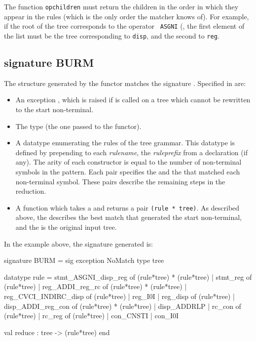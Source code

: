 The function {\tt opchildren} must return the children in the order in
which they appear in the rules (which is the only order the matcher knows
of).  For example, if the root of the tree corresponds to the operator {\tt
ASGNI} (, the first element of the list
must be the tree corresponding to {\tt disp}, and the second 
to {\tt reg}.



	\subsection{signature BURM}

The structure generated by the functor  matches the
signature . Specified in  are:

\begin{itemize}
 	\item An exception , which is raised if  is
called on a tree which cannot be rewritten to the start non-terminal.

 	\item The type  (the one passed to the functor).

 	\item A datatype  enumerating the rules of the tree
grammar. This datatype is defined by prepending to each {\sl rulename},
the {\sl ruleprefix} from a  declaration (if any).
The arity of each constructor is equal to the number of non-terminal
symbols in the pattern. Each  pair specifies the
 and the  that matched each non-terminal symbol.
These pairs describe the remaining steps in the reduction. 

	 \item A function  which takes a  and
returns a pair \verb|(rule * tree)|. As described above, the 
describes the best match that generated the start non-terminal, and the
 is the original input tree.
\end{itemize}

In the example above, the signature  generated is:

\begin{centercode}
signature BURM = sig
  exception NoMatch
  type tree

  datatype rule = 
       stmt_ASGNI_disp_reg  of (rule*tree) * (rule*tree)
     | stmt_reg             of (rule*tree)
     | reg_ADDI_reg_rc      of (rule*tree) * (rule*tree)
     | reg_CVCI_INDIRC_disp of (rule*tree)
     | reg_I0I
     | reg_disp             of (rule*tree)
     | disp_ADDI_reg_con    of (rule*tree) * (rule*tree)
     | disp_ADDRLP
     | rc_con               of (rule*tree)
     | rc_reg               of (rule*tree)
     | con_CNSTI
     | con_I0I

  val reduce : tree -> (rule*tree)
end
\end{centercode}

